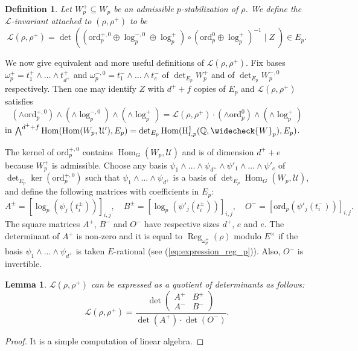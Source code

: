 \documentclass[12pt]{amsart}
\newcommand\bQ{\mathbb{Q}}
\newcommand\cL{\mathcal{L}}
\newcommand\cU{\mathcal{U}}
\newcommand{\ord}{\mathrm{ord}}
\DeclareMathOperator{\Hom}{Hom}
\DeclareMathOperator{\Reg}{Reg}
\newcommand{\HH}{\mathrm{H}}
\newcommand{\ff}{\mathrm{f}}
\theoremstyle{defstyle}
\newtheorem{definition}[subsubsection]{Definition}
\theoremstyle{thmstyle}
\newtheorem{lemme}[subsubsection]{Lemma}
\begin{document}
\begin{definition}
	Let $W^+_p \subseteq W_p$ be an admissible $p$-stabilization of $\rho$. We define the $\cL$-invariant attached to $(\rho,\rho^+)$ to be
	$$\cL(\rho,\rho^+)=\det\left(\left(\ord_p^{+,0} \oplus \log_p^{-,0}\oplus \log_p^+\right) \circ \left(\ord_p^0 \oplus \log_p^+ \right)^{-1} \; \bigg| \; Z\;\right)\in {E_p} .$$ 
\end{definition}
We now give equivalent and more useful definitions of $\cL(\rho,\rho^+)$. Fix bases $\omega_p^+=t_1^+\wedge\ldots\wedge t_{d^+}^+$ and $\omega_p^{-,0}=t^-_1\wedge \ldots \wedge t^-_e$ of $\det_{E_p} W_{p}^+$ and of $\det_{E_p} W^{-,0}_{p}$ respectively. Then one may identify $Z$ with $d^++f$ copies of $E_p$ and $\cL(\rho,\rho^+)$ satisfies 
\begin{equation*}
(\wedge \ord_p^{+,0}) \wedge (\wedge \log_p^{-,0}) \wedge(\wedge \log_p^{+}) = \cL(\rho,\rho^+)\cdot (\wedge \ord_p^{0}) \wedge(\wedge \log_p^{+}) 
\end{equation*}
in ${\bigwedge^{d^++f}}\Hom(\Hom(W_p,\cU'),E_p)= \det_{E_p}\Hom(\HH^1_{\ff,p}(\bQ,\widecheck{W}_p),E_p)$.

The kernel of $\ord_p^{+,0}$ contains $\Hom_G(W_{p},\cU)$ and is of dimension $d^++e$ because $W_p^+$ is admissible. Choose any basis $\psi_1 \wedge \ldots\wedge\psi_{d^+}\wedge\psi'_1\wedge\ldots\wedge\psi'_e$ of $\det_{E_p} \ker \left(\ord_p^{+,0}\right)$ such that $\psi_1 \wedge \ldots\wedge\psi_{d^+}$ is a basis of $\det_{E_p} \Hom_G(W_{p},\cU)$, and define the following matrices with coefficients in ${E_p}$:
\begin{equation}\label{eq:def_mat_A_B_O}
	A^\pm =\left[\log_p\left(\psi_j(t^\pm_i)\right)\right]_{i,j}, \quad B^\pm =\left[\log_p\left(\psi'_j(t^\pm_i)\right)\right]_{i,j}, \quad  O^- =\left[\ord_p\left(\psi'_j(t^-_i)\right)\right]_{i,j}.
\end{equation}
The square matrices $A^+$, $B^-$ and $O^-$ have respective sizes $d^+$, $e$ and $e$. The determinant of $A^+$ is non-zero and it is equal to $\Reg_{\omega_p^+}(\rho)$ modulo $E^\times$ if the basis $\psi_1 \wedge \ldots\wedge\psi_{d^+}$ is taken $E$-rational (see (\ref{eq:expression_reg_p})). Also, $O^-$ is invertible.
\begin{lemme}\label{lem:formule_L_invariant_quot_det}
 $\cL(\rho,\rho^+)$ can be expressed as a quotient of determinants as follows: 
	$$\cL(\rho,\rho^+)= \dfrac{\det \begin{pmatrix}A^+ & B^+ \\ A^- & B^- \end{pmatrix}}{\det(A^+)\cdot\det(O^-)}.$$
\end{lemme}
\begin{proof}It is a simple computation of linear algebra.
\end{proof}
\end{document}

